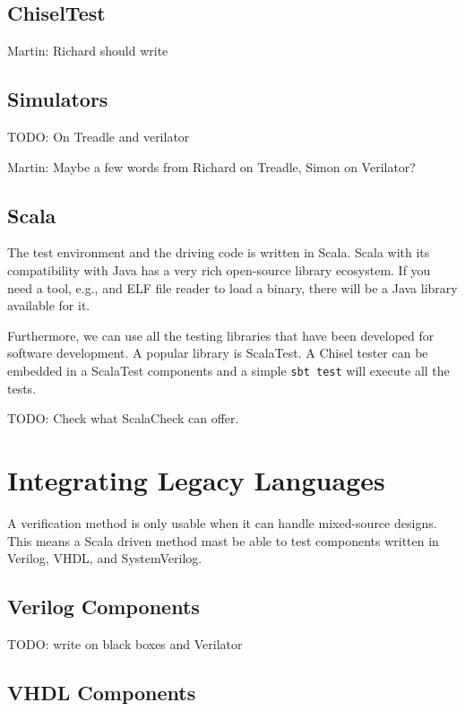 \documentclass[a4paper, conference]{IEEEtran}
\newcommand{\code}[1]{{\small{\texttt{#1}}}}
\newcommand{\todo}[1]{{\color{olive} TODO: #1}}
\newcommand{\martin}[1]{{\color{blue} Martin: #1}}
\begin{document}
\subsection{ChiselTest}

\martin{Richard should write}

\subsection{Simulators}

\todo{On Treadle and verilator}

\martin{Maybe a few words from Richard on Treadle, Simon on Verilator?}



\subsection{Scala}

The test environment and the driving code is written in Scala. Scala with its
compatibility with Java has a very rich open-source library ecosystem.
If you need a tool, e.g., and ELF file reader to load a binary, there will be a Java
library available for it.

Furthermore, we can use all the testing libraries that have been developed for
software development. A popular library is ScalaTest. A Chisel tester can be embedded
in a ScalaTest components and a simple \code{sbt test} will execute all the tests.

\todo{Check what ScalaCheck can offer.}

\section{Integrating Legacy Languages}

A verification method is only usable when it can handle mixed-source designs.
This means a Scala driven method mast be able to test components written in Verilog,
VHDL, and SystemVerilog.

\subsection{Verilog Components}

\todo{write on black boxes and Verilator}

\subsection{VHDL Components}
\end{document}
